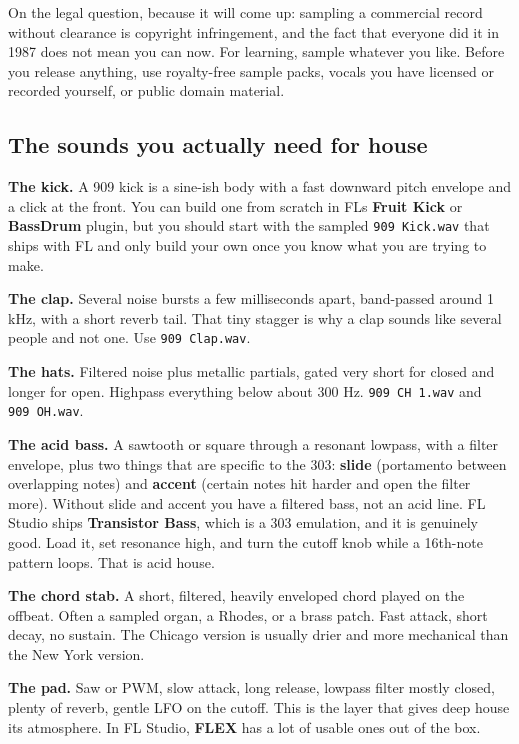 On the legal question, because it will come up: sampling a commercial record without
clearance is copyright infringement, and the fact that everyone did it in 1987 does not mean
you can now. For learning, sample whatever you like. Before you release anything, use
royalty-free sample packs, vocals you have licensed or recorded yourself, or public domain
material.

\subsection{The sounds you actually need for house}\label{th05_sound_design-the-sounds-you-actually-need-for-house}

\textbf{The kick.} A 909 kick is a sine-ish body with a fast downward pitch envelope and a click
at the front. You can build one from scratch in FL\textquotesingle s \textbf{Fruit Kick} or \textbf{BassDrum} plugin,
but you should start with the sampled \texttt{909\ Kick.wav} that ships with FL and only build your
own once you know what you are trying to make.

\textbf{The clap.} Several noise bursts a few milliseconds apart, band-passed around 1 kHz, with
a short reverb tail. That tiny stagger is why a clap sounds like several people and not one.
Use \texttt{909\ Clap.wav}.

\textbf{The hats.} Filtered noise plus metallic partials, gated very short for closed and longer
for open. Highpass everything below about 300 Hz. \texttt{909\ CH\ 1.wav} and \texttt{909\ OH.wav}.

\textbf{The acid bass.} A sawtooth or square through a resonant lowpass, with a filter envelope,
plus two things that are specific to the 303: \textbf{slide} (portamento between overlapping
notes) and \textbf{accent} (certain notes hit harder and open the filter more). Without slide and
accent you have a filtered bass, not an acid line. FL Studio ships \textbf{Transistor Bass},
which is a 303 emulation, and it is genuinely good. Load it, set resonance high, and turn
the cutoff knob while a 16th-note pattern loops. That is acid house.

\textbf{The chord stab.} A short, filtered, heavily enveloped chord played on the offbeat. Often
a sampled organ, a Rhodes, or a brass patch. Fast attack, short decay, no sustain. The
Chicago version is usually drier and more mechanical than the New York version.

\textbf{The pad.} Saw or PWM, slow attack, long release, lowpass filter mostly closed, plenty of
reverb, gentle LFO on the cutoff. This is the layer that gives deep house its atmosphere. In
FL Studio, \textbf{FLEX} has a lot of usable ones out of the box.

